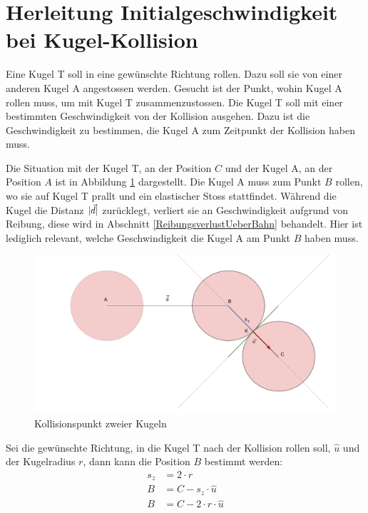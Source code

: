 \section{Herleitung Initialgeschwindigkeit bei Kugel-Kollision}\label{anhang:herleitung:ballCollisionReverse}
Eine Kugel T soll in eine gewünschte Richtung rollen. Dazu soll sie von einer anderen Kugel A angestossen werden.
Gesucht ist der Punkt, wohin Kugel A rollen muss, um mit Kugel T zusammenzustossen.
Die Kugel T soll mit einer bestimmten Geschwindigkeit von der Kollision ausgehen.
Dazu ist die Geschwindigkeit zu bestimmen, die Kugel A  zum Zeitpunkt der Kollision haben muss.

Die Situation mit der Kugel T, an der Position $C$ und der Kugel A, an der Position $A$ ist in Abbildung \ref{fig:ballCollisionPointReverse_anhang}
dargestellt. Die Kugel A muss zum Punkt $B$ rollen, wo sie auf Kugel T prallt und ein elastischer Stoss\cite{wiki.elastischer_stoss_physik:1} stattfindet.
Während die Kugel die Distanz $\lvert \vec{d} \rvert$ zurücklegt, verliert sie an Geschwindigkeit aufgrund von Reibung,
diese wird in Abschnitt \ref{ReibungsverlustUeberBahn} behandelt. Hier ist lediglich relevant, welche Geschwindigkeit
die Kugel A am Punkt $B$ haben muss.

\begin{figure}[h!]
    \begin{center}
        \includegraphics[width=0.6\linewidth]{../common/03_billiard_ai/resources/21_kollisionspunkt_rueckwaerts.png}
    \end{center}
    \caption{Kollisionspunkt zweier Kugeln}
    \label{fig:ballCollisionPointReverse_anhang}
\end{figure}

Sei die gewünschte Richtung, in die Kugel T nach der Kollision rollen soll, $\hat{u}$ und der Kugelradius $r$, dann kann die Position $B$ bestimmt werden:
\begin{align}
    s_z &= 2 \cdot r\\
    B &= C - s_z \cdot \hat{u}\\
    B &= C - 2 \cdot r \cdot \hat{u}
\end{align}

